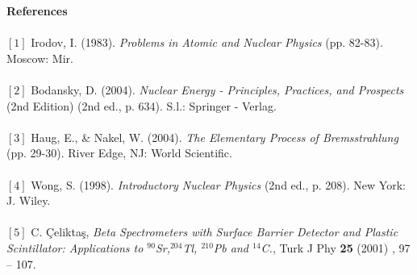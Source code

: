 \documentclass[a4paper,12pt]{article}
\begin{document}
\textbf{References}\\\\
$[1]$ Irodov, I. (1983). \textit{Problems in Atomic and Nuclear Physics} (pp. 82-83). Moscow: Mir.\\\\
$[2]$ Bodansky, D. (2004). \textit{Nuclear Energy - Principles, Practices, and Prospects} (2nd Edition) (2nd ed., p. 634). S.l.: Springer - Verlag.\\\\
$[3]$ Haug, E., \& Nakel, W. (2004). \textit{The Elementary Process of Bremsstrahlung} (pp. 29-30). River Edge, NJ: World Scientific.\\\\
$[4]$ Wong, S. (1998). \textit{Introductory Nuclear Physics} (2nd ed., p. 208). New York: J. Wiley.\\\\
$[5]$ C. Çeliktaş, \textit{Beta Spectrometers with Surface Barrier Detector
and Plastic Scintillator: Applications to
$^{90}$Sr,$^{204}$Tl, $^{210}$Pb and $^{14}$C.}, Turk J Phy
\textbf{25} (2001) , 97 – 107.
\end{document}
